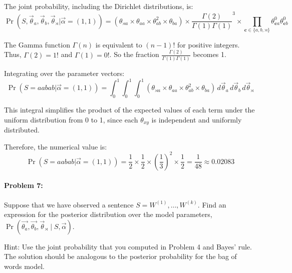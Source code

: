 \documentclass[10pt]{article}
\newenvironment{AnswerBox}{\begin{mdframed}[style=simple]}{\end{mdframed}}
\begin{document}
\begin{AnswerBox}%

    The joint probability, including the Dirichlet distributions, is:
    \[
    \Pr(S, \vec{\theta}_a, \vec{\theta}_b, \vec{\theta}_\rtimes | \vec{\alpha} = (1,1)) = \left( \theta_{\rtimes a} \times \theta_{aa} \times \theta_{ab}^2 \times \theta_{ba} \right) \times \frac{\Gamma(2)}{\Gamma(1)\Gamma(1)}^3 \times \prod_{\mathbf{c} \in \{a, b, \rtimes\}} \theta_{\mathbf{c}a}^0 \theta_{\mathbf{c}b}^0
    \]
    
    The Gamma function \(\Gamma(n)\) is equivalent to \((n-1)!\) for positive integers. Thus, \(\Gamma(2) = 1!\) and \(\Gamma(1) = 0!\). So the fraction \(\frac{\Gamma(2)}{\Gamma(1)\Gamma(1)}\) becomes 1.
    
    Integrating over the parameter vectors:
    \[
    \Pr(S = aabab | \vec{\alpha} = (1,1)) = \int_0^1 \int_0^1 \int_0^1 \left( \theta_{\rtimes a} \times \theta_{aa} \times \theta_{ab}^2 \times \theta_{ba} \right) \, d\vec{\theta}_a \, d\vec{\theta}_b \, d\vec{\theta}_\rtimes
    \]
    
    This integral simplifies the product of the expected values of each term under the uniform distribution from 0 to 1, since each \(\theta_{xy}\) is independent and uniformly distributed.
    
    Therefore, the numerical value is:
    \[
    \Pr(S = aabab | \vec{\alpha} = (1,1)) = \frac{1}{2} \times \frac{1}{2} \times \left(\frac{1}{3}\right)^2 \times \frac{1}{2} = \frac{1}{48} \approx 0.02083
    \]

    
\end{AnswerBox}%

\hrulefill %

\paragraph{Problem 7:}

Suppose that we have observed a sentence
$S=W^{(1)},\dots,W^{(k)}$. Find an expression for the posterior
distribution over the model parameters,
$\Pr(\vec{\theta_a}, \vec{\theta_b}, \vec{\theta}_{\rtimes} \mid S,
\vec{\alpha})$.

 Hint: Use the joint probability that you computed in Problem
4 and Bayes' rule. The solution should be analogous to the posterior
probability for the bag of words model.
\end{document}
